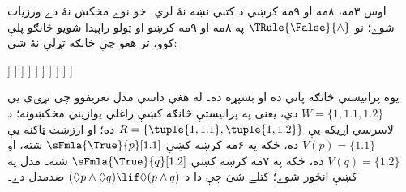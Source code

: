 \documentclass[../../../include/open-logic-section]{subfiles}
\begin{document}
{\begin{ex}
  اوس ۳مه، ۸مه او ۹مه کرښې د کتنې نښه نۀ لري۔ خو نوے
  مخکښ نۀ دے ورزيات شوے؛ نو $\TRule{\False}{\land}$
  په ۸مه او ۹مه کرښو او ټولو راپيدا شويو څانګو پلې کوو،
  تر هغو چې څانګه تړلې نۀ شي:
  \begin{oltableau}
    [\pFmla{\False}{(\Diamond p \land \Diamond q) \lif \Diamond(p \land q)}{1},
      just = \TAss, checked
      [\pFmla{\True}{\Diamond p \land \Diamond q}{1},
        just = {\TRule{\False}{\lif}[1]}, checked
        [\pFmla{\False}{\Diamond(p \land q)}{1},
          just = {\TRule{\False}{\lif}[1]}
          [\pFmla{\True}{\Diamond p}{1},
            just = {\TRule{\True}{\land}[2]}, checked
            [\pFmla{\True}{\Diamond q}{1},
              just = {\TRule{\True}{\land}[2]}, checked
              [\pFmla{\True}{p}{1.1}, 
                just = {\TRule{\True}{\Diamond}[4]}, checked
                [\pFmla{\True}{q}{1.2}, 
                  just = {\TRule{\True}{\Diamond}[5]}, checked
                  [\pFmla{\False}{p \land q}{1.1}, 
                    just = {\TRule{\False}{\Diamond}[3]}, checked
                    [\pFmla{\False}{p \land q}{1.2}, 
                      just = {\TRule{\False}{\Diamond}[3]}, checked
                      [\pFmla{\False}{p}{1.1},
                        just = {\TRule{\False}{\land}[8]}, checked, close
                      ]
                      [\pFmla{\False}{q}{1.1},
                        just = {\TRule{\False}{\land}[8]}, checked
                        [\pFmla{\False}{p}{1.2},
                          just = {\TRule{\False}{\land}[9]}, checked]
                        [\pFmla{\False}{q}{1.2},
                          just = {\TRule{\False}{\land}[9]}, checked, close]
                      ]
                    ]
                  ]
                ]
              ]
            ]
          ]
        ]
      ]
    ]
  \end{oltableau}
  يوه پرانيستې څانګه پاتې ده او بشپړه ده۔ له هغې داسې مدل
  تعريفوو چې نړۍې يې $W = \{1, 1.1, 1.2\}$ دي، يعنې
  په پرانيستې څانګه کښې راغلي يوازيني مخکښونه؛ د لاسرسي
  اړيکه يې $R = \{\tuple{1, 1.1}, \tuple{1, 1.2}\}$ ده؛
  او ارزښت ټاکنه يې $V(p) = \{1.1\}$ ده، ځکه په ۶مه کرښه
  کښې $\sFmla{\True}{p}[1.1]$ شته، او $V(q) = \{1.2\}$
  ده، ځکه په ۷مه کرښه کښې
  $\sFmla{\True}{q}[1.2]$ شته۔ مدل په  کښې انځور
  شوے؛ کتلے شئ چې دا د
  $(\Diamond p \land \Diamond q) \lif \Diamond (p \land q)$
  ضدمدل دے۔
  \begin{figure}
  \begin{center}
    \begin{tikzpicture}[modal]

\end{tikzpicture}
\end{center}
\end{figure}
\end{ex}}
\end{document}
